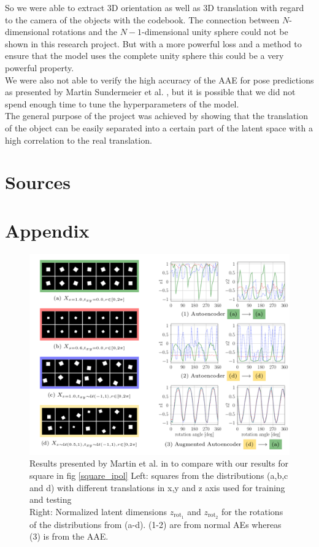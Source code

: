 \documentclass[10pt,a4paper]{article}
\newcommand{\rot}{\ensuremath{\text{rot}\xspace}}
\begin{document}
So we were able to extract 3D orientation as well as 3D translation with regard to the camera of the objects with the codebook.
The connection between $N$-dimensional rotations and the $N-1$-dimensional unity sphere could not be shown in this research project. But with a more powerful loss and a method to ensure that the model uses the complete unity sphere this could be a very powerful property.\\
We were also not able to verify the high accuracy of the AAE for pose predictions as presented by Martin Sundermeier et al. \cite{3D_Orientation_Learning}, but it is possible that we did not spend enough time to tune the hyperparameters of the model.\\
The general purpose of the project was achieved by showing that the translation of the object can be easily separated into a certain part of the latent space with a high correlation to the real translation.


\newpage
\section{Sources}\label{Sources}
\printbibliography

\newpage
\section{Appendix}
\begin{figure}
    \center
    \includegraphics[width = \linewidth]{MARTIN_Squares.png}
    \caption{Results presented by Martin et al. in \cite{3D_Orientation_Learning} to compare with our results for square in fig \ref{square_ipol}
        Left: squares from the distributions (a,b,c and d) with different translations in x,y and z axis used for training and testing\\
    Right: Normalized latent dimensions $z_{\rot_1}$ and $z_{\rot_2}$ for the rotations of the distributions from (a-d). (1-2) are from normal AEs whereas (3) is from the AAE.}\label{SQUARE_Martin}
\end{figure}
\end{document}
